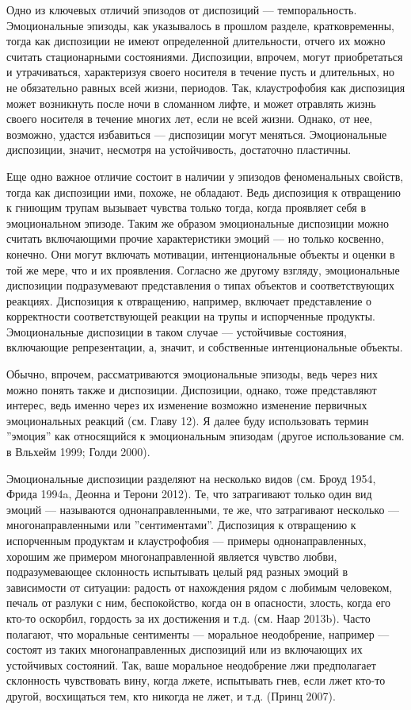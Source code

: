 \documentclass[11pt]{book}
\begin{document}
Одно из ключевых отличий эпизодов от диспозиций --- темпоральность. Эмоциональные эпизоды, как указывалось в прошлом разделе, кратковременны, тогда как диспозиции не имеют определенной длительности, отчего их можно считать стационарными состояниями. Диспозиции, впрочем, могут приобретаться и утрачиваться, характеризуя своего носителя в течение пусть и длительных, но не обязательно равных всей жизни, периодов. Так, клаустрофобия как диспозиция может возникнуть после ночи в сломанном лифте, и может отравлять жизнь своего носителя в течение многих лет, если не всей жизни. Однако, от нее, возможно, удастся избавиться --- диспозиции могут меняться. Эмоциональные диспозиции, значит, несмотря на устойчивость, достаточно пластичны.

Еще одно важное отличие состоит в наличии у эпизодов феноменальных свойств, тогда как диспозиции ими, похоже, не обладают. Ведь диспозиция к отвращению к гниющим трупам вызывает чувства только тогда, когда проявляет себя в эмоциональном эпизоде. Таким же образом эмоциональные диспозиции можно считать включающими прочие характеристики эмоций --- но только косвенно, конечно. Они могут включать мотивации, интенциональные объекты и оценки в той же мере, что и их проявления. Согласно же другому взгляду, эмоциональные диспозиции подразумевают представления о типах объектов и соответствующих реакциях. Диспозиция к отвращению, например, включает представление о корректности соответствующей реакции на трупы и испорченные продукты. Эмоциональные диспозиции в таком случае --- устойчивые состояния, включающие репрезентации, а, значит, и собственные интенциональные объекты.

Обычно, впрочем, рассматриваются эмоциональные эпизоды, ведь через них можно понять также и диспозиции. Диспозиции, однако, тоже представляют интерес, ведь именно через их изменение возможно изменение первичных эмоциональных реакций (см. Главу 12). Я далее буду использовать термин ''эмоция'' как относящийся к эмоциональным эпизодам (другое использование см. в Вльхейм 1999; Голди 2000).

Эмоциональные диспозиции разделяют на несколько видов (см. Броуд 1954, Фрида 1994a, Деонна и Терони 2012). Те, что затрагивают только один вид эмоций --- называются однонаправленными, те же, что затрагивают несколько --- многонаправленными или ''сентиментами''. Диспозиция к отвращению к испорченным продуктам и клаустрофобия --- примеры однонаправленных, хорошим же примером многонаправленной является чувство любви, подразумевающее склонность испытывать целый ряд разных эмоций в зависимости от ситуации: радость от нахождения рядом с любимым человеком, печаль от разлуки с ним, беспокойство, когда он в опасности, злость, когда его кто-то оскорбил, гордость за их достижения и т.д. (см. Наар 2013b). Часто полагают, что моральные сентименты --- моральное неодобрение, например --- состоят из таких многонаправленных диспозиций или из включающих их устойчивых состояний. Так, ваше моральное неодобрение лжи предполагает склонность чувствовать вину, когда лжете, испытывать гнев, если лжет кто-то другой, восхищаться тем, кто никогда не лжет, и т.д. (Принц 2007).
\end{document}
